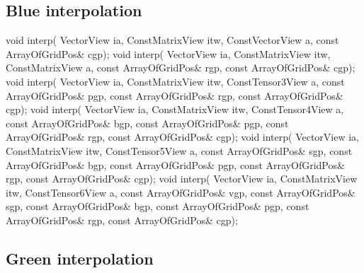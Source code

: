 \subsection{Blue interpolation}

\begin{code}
void interp( VectorView            ia,
             ConstMatrixView       itw,
             ConstVectorView       a,    
             const ArrayOfGridPos& cgp);
void interp( VectorView            ia,
             ConstMatrixView       itw,
             ConstMatrixView       a,    
             const ArrayOfGridPos& rgp,
             const ArrayOfGridPos& cgp);
void interp( VectorView            ia,
             ConstMatrixView       itw,
             ConstTensor3View      a,    
             const ArrayOfGridPos& pgp,
             const ArrayOfGridPos& rgp,
             const ArrayOfGridPos& cgp);
void interp( VectorView            ia,
             ConstMatrixView       itw,
             ConstTensor4View      a,    
             const ArrayOfGridPos& bgp,
             const ArrayOfGridPos& pgp,
             const ArrayOfGridPos& rgp,
             const ArrayOfGridPos& cgp);
void interp( VectorView            ia,
             ConstMatrixView       itw,
             ConstTensor5View      a,    
             const ArrayOfGridPos& sgp,
             const ArrayOfGridPos& bgp,
             const ArrayOfGridPos& pgp,
             const ArrayOfGridPos& rgp,
             const ArrayOfGridPos& cgp);
void interp( VectorView            ia,
             ConstMatrixView       itw,
             ConstTensor6View      a,    
             const ArrayOfGridPos& vgp,
             const ArrayOfGridPos& sgp,
             const ArrayOfGridPos& bgp,
             const ArrayOfGridPos& pgp,
             const ArrayOfGridPos& rgp,
             const ArrayOfGridPos& cgp);
\end{code}

\subsection{Green interpolation}

